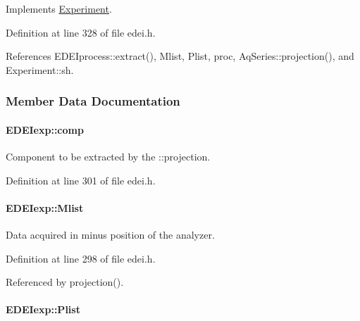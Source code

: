 Implements \hyperlink{classExperiment_a154d68b031d0e181295ee2adbd66d8c3}{Experiment}.



Definition at line 328 of file edei.h.



References EDEIprocess::extract(), Mlist, Plist, proc, AqSeries::projection(), and Experiment::sh.



\subsubsection{Member Data Documentation}
\hypertarget{classEDEIexp_aac525f5702a63162fcf932c22887d38d}{
\paragraph[{comp}]{ {\bf EDEIexp::comp}}\hfill}
\label{classEDEIexp_aac525f5702a63162fcf932c22887d38d}


Component to be extracted by the ::projection. 



Definition at line 301 of file edei.h.

\hypertarget{classEDEIexp_a2a50bb3a6dec03af81b4a81d26076cb8}{
\paragraph[{Mlist}]{ {\bf EDEIexp::Mlist}}\hfill}
\label{classEDEIexp_a2a50bb3a6dec03af81b4a81d26076cb8}


Data acquired in minus position of the analyzer. 



Definition at line 298 of file edei.h.



Referenced by projection().

\hypertarget{classEDEIexp_a543188a600c7951ad9c25c2fb3c1561f}{
\paragraph[{Plist}]{ {\bf EDEIexp::Plist}}\hfill}
\label{classEDEIexp_a543188a600c7951ad9c25c2fb3c1561f}


